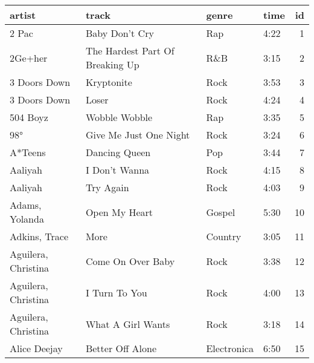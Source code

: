 \begin{tabular}{llllr}
  \toprule
 artist & track & genre & time & id \\ 
  \midrule
  2 Pac & Baby Don't Cry & Rap & 4:22 &   1 \\ 
  2Ge+her & The Hardest Part Of Breaking Up & R\&B & 3:15 &   2 \\ 
  3 Doors Down & Kryptonite & Rock & 3:53 &   3 \\ 
  3 Doors Down & Loser & Rock & 4:24 &   4 \\ 
  504 Boyz & Wobble Wobble & Rap & 3:35 &   5 \\ 
  98° & Give Me Just One Night & Rock & 3:24 &   6 \\ 
  A*Teens & Dancing Queen & Pop & 3:44 &   7 \\ 
  Aaliyah & I Don't Wanna & Rock & 4:15 &   8 \\ 
  Aaliyah & Try Again & Rock & 4:03 &   9 \\ 
  Adams, Yolanda & Open My Heart & Gospel & 5:30 &  10 \\ 
  Adkins, Trace & More & Country & 3:05 &  11 \\ 
  Aguilera, Christina & Come On Over Baby & Rock & 3:38 &  12 \\ 
  Aguilera, Christina & I Turn To You & Rock & 4:00 &  13 \\ 
  Aguilera, Christina & What A Girl Wants & Rock & 3:18 &  14 \\ 
  Alice Deejay & Better Off Alone & Electronica & 6:50 &  15 \\ 
   \bottomrule
\end{tabular}
